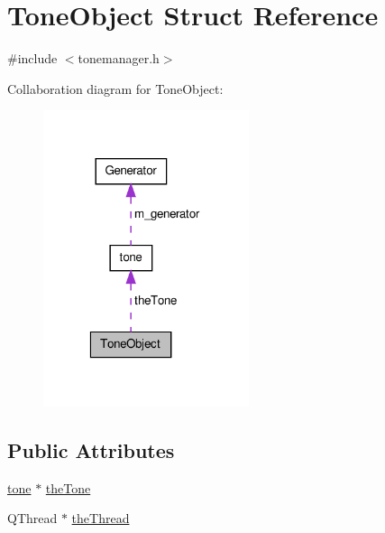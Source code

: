 \hypertarget{struct_tone_object}{\section{Tone\-Object Struct Reference}
\label{struct_tone_object}
}


{\ttfamily \#include $<$tonemanager.\-h$>$}



Collaboration diagram for Tone\-Object\-:
\nopagebreak
\begin{figure}[H]
\begin{center}
\leavevmode
\includegraphics[width=171pt]{struct_tone_object__coll__graph}
\end{center}
\end{figure}
\subsection*{Public Attributes}
\begin{DoxyCompactItemize}
\item 
\hyperlink{classtone}{tone} $\ast$ \hyperlink{struct_tone_object_a47610a83de0887b5c8e5d8e009312958}{the\-Tone}
\item 
Q\-Thread $\ast$ \hyperlink{struct_tone_object_abeb12728a40883a44c0440db7dbb1732}{the\-Thread}
\end{DoxyCompactItemize}


